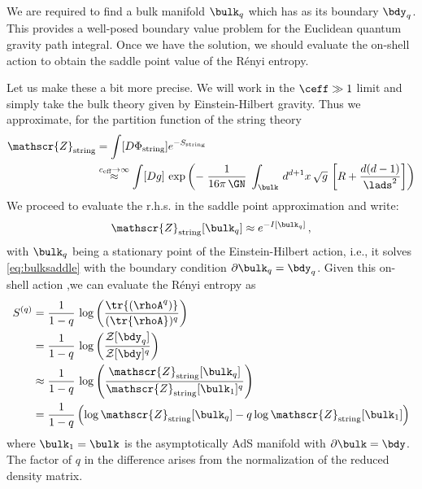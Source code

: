 \documentclass[12pt,openany]{book}
\begin{document}
We are required to find a bulk manifold $\bulk_q$ which has as its boundary $\bdy_q$. This provides a well-posed boundary value problem for the Euclidean quantum gravity path integral. Once we have the solution, we should evaluate the on-shell action to obtain the saddle point value of the R\'enyi entropy.


Let us make these a bit more precise. We will work in the $\ceff \gg 1$ limit and simply take the bulk theory given by Einstein-Hilbert gravity. Thus we approximate, for the partition function of the string theory
%
\begin{equation}
\begin{split}
\mathscr{Z}_\text{string}
&=
  \int [D\Phi_\text{string}] e^{-S_\text{string}} \\
&
  \stackrel{c_\text{eff}\to \infty}{\approx}
  \int [Dg] \, \exp\left(-\;\frac{1}{16\pi\,\GN} \; \int_\bulk\, d^{d+1}x\, \sqrt{g}\, \left[R
  + \frac{d(d-1)}{\lads^2}\right] \right)
\end{split}
\label{eq:Zstr}
\end{equation}
%
We proceed to evaluate the r.h.s. in the saddle point approximation and write:
%
\begin{equation}
\mathscr{Z}_\text{string} [\bulk_q] \approx e^{-I[\bulk_q]} \,,
\label{}
\end{equation}
%
with $\bulk_q$ being a stationary point of the Einstein-Hilbert action, i.e., it solves \eqref{eq:bulksaddle} with the boundary condition $\partial\bulk_q = \bdy_q$. Given this on-shell action ,we can evaluate the R\'enyi entropy as
%
\begin{equation}
\begin{split}
S^{(q)} &=  \frac{1}{1-q}\, \log \left( \frac{\tr{(\rhoA^q)}}{(\tr{\rhoA})^q} \right)  \\
&
  = \frac{1}{1-q} \, \log\left(\frac{\mathcal{Z}[\bdy_q]}{\mathcal{Z}[\bdy]^q} \right) \\
&
  \approx \frac{1}{1-q} \,
  \log\left(\frac{ \mathscr{Z}_\text{string}[\bulk_q] }{\mathscr{Z}_\text{string}[\bulk_1]^q } \right) \\
&
  = \frac{1}{1-q}  \left( \log \mathscr{Z}_\text{string} [\bulk_q]  -q \log\mathscr{Z}_\text{string} [\bulk_1]  \right)
\end{split}
\label{}
\end{equation}
%
where $\bulk_1 = \bulk$ is the asymptotically AdS manifold with $\partial \bulk = \bdy$. The factor of $q$ in the difference arises from the normalization of the reduced density matrix.
\end{document}
